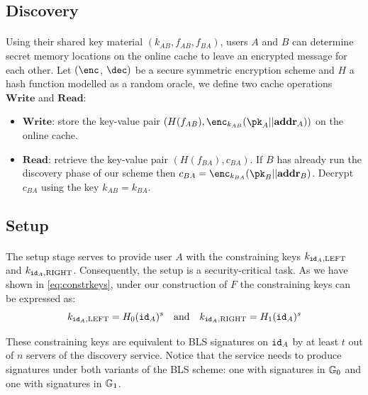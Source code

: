 	\subsection{Discovery}
	
		\paragraph{} Using their shared key material $(k_{AB}, f_{AB}, f_{BA})$, users $A$ and $B$ can determine secret memory locations on the online cache to leave an encrypted message for each other. Let $(\enc$, $\dec)$ be a secure symmetric encryption scheme and $H$ a hash function modelled as a random oracle, we define two cache operations $\mathbf{Write}$ and $\mathbf{Read}$:
		\begin{itemize}
			\item $\mathbf{Write}$: store the key-value pair $(H(f_{AB}), \enc_{k_{AB}}(\pk_A || \addr_A))$ on the online cache.
			\item $\mathbf{Read}$: retrieve the key-value pair $(H(f_{BA}), c_{BA})$. If $B$ has already run the discovery phase of our scheme then $c_{BA} = \enc_{k_{BA}}(\pk_B||\addr_B)$. Decrypt $c_{BA}$ using the key $k_{AB} = k_{BA}$.
		\end{itemize}
	
	\subsection{Setup}
	\label{sec:setup}
		
		\paragraph{}  The setup stage serves to provide user $A$ with the constraining keys $k_{\mathtt{id}_A,\mathrm{LEFT}}$ and $k_{\mathtt{id}_A,\mathrm{RIGHT}}$. Consequently, the setup is a security-critical task. As we have shown in \autoref{eq:constrkeys}, under our construction of $F$ the constraining keys can be expressed as:
		\begin{equation}
			k_{\mathtt{id}_A,\mathrm{LEFT}} = H_0(\mathtt{id}_A)^s \quad \mathrm{and} \quad k_{\mathtt{id}_A,\mathrm{RIGHT}} = H_1(\mathtt{id}_A)^s
		\end{equation}
		
		\noindent These constraining keys are equivalent to BLS signatures on $\mathtt{id}_A$ by at least $t$ out of $n$ servers of the discovery service. Notice that the service needs to produce signatures under both variants of the BLS scheme: one with signatures in $\mathbb{G}_0$ and one with signatures in $\mathbb{G}_1$.
				

